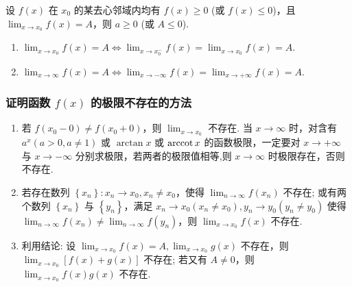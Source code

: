 \begin{theorem}[函数极限的保号性]
    设 $f(x)$ 在 $x_0$ 的某去心邻域内均有 $f(x)\geqslant 0$ (或 $f(x)\leqslant 0$)，且 $\displaystyle\lim_{x\to x_0}f(x)=A$，则 $a\geqslant 0$ (或 $A\leqslant 0$).
\end{theorem}

\begin{theorem}[函数极限的充要条件]
    \begin{enumerate}[label=(\arabic{*})]
        \item $\displaystyle\lim _{x \rightarrow x_{0}} f(x)=A \Leftrightarrow \lim _{x \rightarrow x_{0}^{-}} f(x)=\lim _{x \rightarrow x_{0}} f(x)=A $.
        \item $\displaystyle\lim _{x \rightarrow \infty} f(x)=A \Leftrightarrow \lim _{x \rightarrow-\infty} f(x)=\lim _{x \rightarrow+\infty} f(x)=A .$
    \end{enumerate}
\end{theorem}

\subsubsection{证明函数 $ f(x) $ 的极限不存在的方法}

\begin{enumerate}[label=(\arabic{*})]
    \item 若 $ f\left(x_{0}-0\right) \neq f\left(x_{0}+0\right)$，则 $\displaystyle \lim _{x \rightarrow x_{0}} $ 不存在. 当 $ x \rightarrow \infty $ 时，对含有 $ a^{x}(a>0, a \neq 1) $ 或 $ \arctan x $ 或 $ \arccot x $ 的函数极限，一定要对 $ x \rightarrow+\infty $ 与 $ x \rightarrow-\infty $ 分别求极限，若两者的极限值相等,则 $ x \rightarrow \infty $ 时极限存在，否则不存在.
    \item 若存在数列 $ \left\{x_{n}\right\}: x_{n} \rightarrow x_{0}, x_{n} \neq x_{0} $，使得 $\displaystyle \lim _{n \rightarrow \infty} f\left(x_{n}\right) $ 不存在; 或有两个数列 $ \left\{x_{n}\right\} $ 与 $ \left\{y_{n}\right\} $，满足 $ x_{n} \rightarrow x_{0}\left(x_{n} \neq x_{0}\right), y_{n} \rightarrow y_{0}\left(y_{n} \neq y_{0}\right) $ 使得 $ \displaystyle\lim _{n \rightarrow \infty} f\left(x_{n}\right) \neq \lim _{n \rightarrow \infty} f\left(y_{n}\right) $，则 $ \displaystyle\lim _{x \rightarrow x_{0}} f(x) $ 不存在.
    \item 利用结论: 设 $\displaystyle \lim _{x \rightarrow x_{0}} f(x)=A, \lim _{x \rightarrow x_{0}} g(x) $ 不存在，则 $\displaystyle \lim _{x \rightarrow x_{0}}[f(x)+g(x)] $ 不存在; 若又有 $ A \neq 0 $，则 $ \displaystyle\lim _{x \rightarrow x_{0}} f(x) g(x) $ 不存在.
\end{enumerate}

